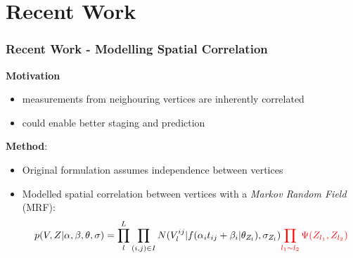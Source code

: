 \documentclass[8pt,xcolor=table]{beamer}
\begin{document}
\section{Recent Work}

\begin{frame}
\frametitle{Recent Work - Modelling Spatial Correlation}

\textbf{Motivation}
\begin{itemize}
 \item measurements from neighouring vertices are inherently correlated
 \item could enable better staging and prediction
\end{itemize}


\textbf{Method}:
\begin{itemize}
 \item Original formulation assumes independence between vertices
 \item Modelled spatial correlation between vertices with a \emph{Markov Random Field} (MRF):
$$ p(V, Z | \alpha, \beta, \theta, \sigma) = \prod_l^L \prod_{(i,j) \in I} N(V_l^{ij} | f(\alpha_i t_{ij} + \beta_i | \theta_{Z_l}), \sigma_{Z_l}) \textcolor{red}{\prod_{l_1 \sim l_2} \Psi (Z_{l_1}, Z_{l_2})}$$



\vspace{-1em}


\end{itemize}
\end{frame}
\end{document}
